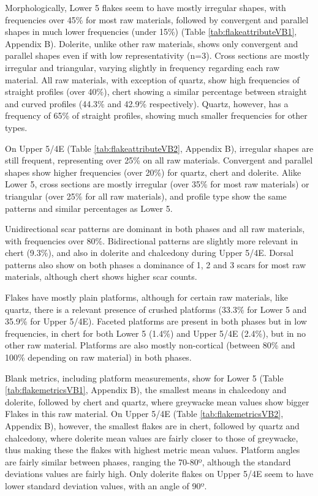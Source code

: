 \documentclass[12pt,twoside]{reedthesis}
\begin{document}
Morphologically, Lower 5 flakes seem to have mostly irregular shapes, with frequencies over 45\% for most raw materials, followed by convergent and parallel shapes in much lower frequencies (under 15\%) (Table \ref{tab:flakeattributeVB1}, Appendix B). Dolerite, unlike other raw materials, shows only convergent and parallel shapes even if with low representativity (n=3). Cross sections are mostly irregular and triangular, varying slightly in frequency regarding each raw material. All raw materials, with exception of quartz, show high frequencies of straight profiles (over 40\%), chert showing a similar percentage between straight and curved profiles (44.3\% and 42.9\% respectively). Quartz, however, has a frequency of 65\% of straight profiles, showing much smaller frequencies for other types.

On Upper 5/4E (Table \ref{tab:flakeattributeVB2}, Appendix B), irregular shapes are still frequent, representing over 25\% on all raw materials. Convergent and parallel shapes show higher frequencies (over 20\%) for quartz, chert and dolerite. Alike Lower 5, cross sections are mostly irregular (over 35\% for most raw materials) or triangular (over 25\% for all raw materials), and profile type show the same patterns and similar percentages as Lower 5.

Unidirectional scar patterns are dominant in both phases and all raw materials, with frequencies over 80\%. Bidirectional patterns are slightly more relevant in chert (9.3\%), and also in dolerite and chalcedony during Upper 5/4E. Dorsal patterns also show on both phases a dominance of 1, 2 and 3 scars for most raw materials, although chert shows higher scar counts.

Flakes have mostly plain platforms, although for certain raw materials, like quartz, there is a relevant presence of crushed platforms (33.3\% for Lower 5 and 35.9\% for Upper 5/4E). Faceted platforms are present in both phases but in low frequencies, in chert for both Lower 5 (1.4\%) and Upper 5/4E (2.4\%), but in no other raw material. Platforms are also mostly non-cortical (between 80\% and 100\% depending on raw material) in both phases.

Blank metrics, including platform measurements, show for Lower 5 (Table \ref{tab:flakemetricsVB1}, Appendix B), the smallest means in chalcedony and dolerite, followed by chert and quartz, where greywacke mean values show bigger Flakes in this raw material. On Upper 5/4E (Table \ref{tab:flakemetricsVB2}, Appendix B), however, the smallest flakes are in chert, followed by quartz and chalcedony, where dolerite mean values are fairly closer to those of greywacke, thus making these the flakes with highest metric mean values. Platform angles are fairly similar between phases, ranging the 70-80º, although the standard deviations values are fairly high. Only dolerite flakes on Upper 5/4E seem to have lower standard deviation values, with an angle of 90º.
\end{document}

